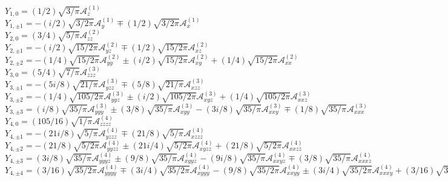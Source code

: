 \documentclass{article}
\begin{document}
$Y_{1,0} =
(1/2)\sqrt{3/\pi}{\mathcal A}^{(1)}_{z}$\\
$Y_{1,\pm 1} =
 -(i/2)\sqrt{3/2\pi}{\mathcal A}^{(1)}_{y}
 \mp(1/2)\sqrt{3/2\pi}{\mathcal A}^{(1)}_{x}$\\
$Y_{2,0} =
(3/4)\sqrt{5/\pi}{\mathcal A}^{(2)}_{zz}$\\
$Y_{2,\pm 1} =
 -(i/2)\sqrt{15/2\pi}{\mathcal A}^{(2)}_{yz}
 \mp(1/2)\sqrt{15/2\pi}{\mathcal A}^{(2)}_{xz}$\\
$Y_{2,\pm 2} =
 -(1/4)\sqrt{15/2\pi}{\mathcal A}^{(2)}_{yy}
 \pm(i/2)\sqrt{15/2\pi}{\mathcal A}^{(2)}_{xy}
 +(1/4)\sqrt{15/2\pi}{\mathcal A}^{(2)}_{xx}$\\
$Y_{3,0} =
(5/4)\sqrt{7/\pi}{\mathcal A}^{(3)}_{zzz}$\\
$Y_{3,\pm 1} =
 -(5i/8)\sqrt{21/\pi}{\mathcal A}^{(3)}_{yzz}
 \mp(5/8)\sqrt{21/\pi}{\mathcal A}^{(3)}_{xzz}$\\
$Y_{3,\pm 2} =
 -(1/4)\sqrt{105/2\pi}{\mathcal A}^{(3)}_{yyz}
 \pm(i/2)\sqrt{105/2\pi}{\mathcal A}^{(3)}_{xyz}
 +(1/4)\sqrt{105/2\pi}{\mathcal A}^{(3)}_{xxz}$\\
$Y_{3,\pm 3} =
(i/8)\sqrt{35/\pi}{\mathcal A}^{(3)}_{yyy}
 \pm(3/8)\sqrt{35/\pi}{\mathcal A}^{(3)}_{xyy}
 -(3i/8)\sqrt{35/\pi}{\mathcal A}^{(3)}_{xxy}
 \mp(1/8)\sqrt{35/\pi}{\mathcal A}^{(3)}_{xxx}$\\
$Y_{4,0} =
(105/16)\sqrt{1/\pi}{\mathcal A}^{(4)}_{zzzz}$\\
$Y_{4,\pm 1} =
 -(21i/8)\sqrt{5/\pi}{\mathcal A}^{(4)}_{yzzz}
 \mp(21/8)\sqrt{5/\pi}{\mathcal A}^{(4)}_{xzzz}$\\
$Y_{4,\pm 2} =
 -(21/8)\sqrt{5/2\pi}{\mathcal A}^{(4)}_{yyzz}
 \pm(21i/4)\sqrt{5/2\pi}{\mathcal A}^{(4)}_{xyzz}
 +(21/8)\sqrt{5/2\pi}{\mathcal A}^{(4)}_{xxzz}$\\
$Y_{4,\pm 3} =
(3i/8)\sqrt{35/\pi}{\mathcal A}^{(4)}_{yyyz}
 \pm(9/8)\sqrt{35/\pi}{\mathcal A}^{(4)}_{xyyz}
 -(9i/8)\sqrt{35/\pi}{\mathcal A}^{(4)}_{xxyz}
 \mp(3/8)\sqrt{35/\pi}{\mathcal A}^{(4)}_{xxxz}$\\
$Y_{4,\pm 4} =
(3/16)\sqrt{35/2\pi}{\mathcal A}^{(4)}_{yyyy}
 \mp(3i/4)\sqrt{35/2\pi}{\mathcal A}^{(4)}_{xyyy}
 -(9/8)\sqrt{35/2\pi}{\mathcal A}^{(4)}_{xxyy}
 \pm(3i/4)\sqrt{35/2\pi}{\mathcal A}^{(4)}_{xxxy}
 +(3/16)\sqrt{35/2\pi}{\mathcal A}^{(4)}_{xxxx}$\\
\end{document}
